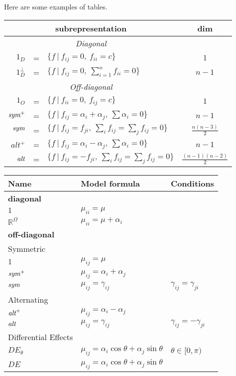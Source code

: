 \documentclass[11pt,a4paper]{article}
\newcommand{\real}{\mathbb{R}}
\newcommand{\sym}{\mbox{\em sym}}                           %
\newcommand{\alt}{\mbox{\em alt}}                           %
\newcommand{\ro}{\real^{\scriptstyle \Omega}}               %
\begin{document}
Here are some examples of tables.



\begin{center}
\begin{tabular}{rclc}
\multicolumn{3}{c}{subrepresentation} & dim \\
\hline
\multicolumn{3}{c}{\em Diagonal}&\\
$1_D$ &=& ${\scriptstyle \{f~|~f_{ij}=0,~ f_{ii}=c\}}$& ${\scriptstyle 1}$\\
$1^\perp_D$ &=& ${\scriptstyle \{f~|~f_{ij}=0,~ \sum_{i=1}^n f_{ii}=0\}}$& ${\scriptstyle n-1}$\\
\hline
\multicolumn{3}{c}{\em Off-diagonal}&\\
$1_O$ &=& ${\scriptstyle \{f~|~f_{ii}=0,~ f_{ij}=c\}}$ & ${\scriptstyle 1}$\\
$\sym^+$ &=& ${\scriptstyle \{f~|~f_{ij}= \alpha_i+\alpha_j,~ \sum \alpha_i=0\}}$&
${\scriptstyle n-1}$\\
$\sym$ &=& ${\scriptstyle \{f~|~f_{ij}=f_{ji},~ \sum_i f_{ij}=\sum_j f_{ij}=0\}}$&
${\scriptstyle \frac{n(n-3)}{2}}$\\
$alt^+$  &=& ${\scriptstyle \{f~|~f_{ij}= \alpha_i-\alpha_j,~ \sum \alpha_i=0\}}$& ${\scriptstyle n-1
}$\\
$\alt$ &=& ${\scriptstyle \{f~|~f_{ij}=- f_{ji},~ \sum_i f_{ij}=\sum_j f_{ij}=0\}}$&
${\scriptstyle \frac{(n-1)(n-2)}{2}}$
\end{tabular}
\end{center}



\begin{center}
{\small
\begin{tabular}{lll}
Name & Model formula & Conditions \\
\hline
\multicolumn{2}{l}{{\bf diagonal}}\\
$1$ & ${\textstyle \mu_{ii} = \mu} $\\
$\ro$ &${\textstyle \mu_{ii} = \mu + \alpha_i}$ \\
\hline
\multicolumn{2}{l}{{\bf off-diagonal}}\\
{Symmetric}\\
$1$ &${\textstyle \mu_{ij} =  \mu}$\\
$\sym^+$ &${\textstyle \mu_{ij} =  \alpha_i+\alpha_j}$\\
$\sym$& ${\textstyle \mu_{ij} =  \gamma_{ij}}$ &
${\textstyle \gamma_{ij} = \gamma_{ji}}$\\
{Alternating}\\
$\alt^+$ & ${\textstyle \mu_{ij} =  \alpha_i-\alpha_j}$\\
$\alt$ & ${\textstyle \mu_{ij} =  \gamma_{ij}}$ &
${\textstyle \gamma_{ij} = -\gamma_{ji}}$\\
{Differential Effects}\\
$DE_\theta$ & ${\textstyle \mu_{ij} =  \alpha_i \cos\theta
+\alpha_j \sin\theta}$ & ${\textstyle \theta \in [0,\pi)}$\\
$DE$ & ${\textstyle \mu_{ij} =  \alpha_i \cos\theta
+\alpha_j \sin\theta}$ & \\
\hline
\end{tabular}
}
\end{center}
\end{document}
